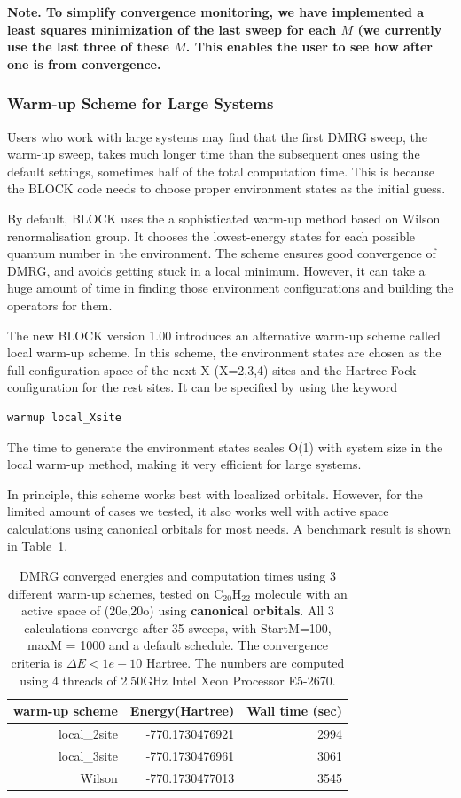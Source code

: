 \documentclass[letterpaper,12pt,aps, pra]{revtex4-1}
\begin{document}
{\bf Note.  To simplify convergence monitoring, we have implemented a least
squares minimization of the last sweep for each $M$ (we currently use the last
three of these $M$. This enables the user to see how after one is from
convergence.}

\subsubsection{Warm-up Scheme for Large Systems}
Users who work with large systems may find that the first DMRG sweep, the warm-up sweep, takes much longer time than the subsequent ones using the default settings, sometimes half of the total computation time. This is because the BLOCK code needs to choose proper environment states as the initial guess. 

By default, BLOCK uses the a sophisticated warm-up method based on Wilson renormalisation group. It chooses the lowest-energy states for each possible quantum number in the environment. The scheme ensures good convergence of DMRG, and avoids getting stuck in a local minimum. However, it can take a huge amount of time in finding those environment configurations and building the operators for them. 

The new BLOCK version 1.00 introduces an alternative warm-up scheme called local warm-up scheme. In this scheme, the environment states are chosen as the full configuration space of the next X (X=2,3,4) sites and the Hartree-Fock configuration for the rest sites. It can be specified by using the keyword
\begin{verbatim}
warmup local_Xsite
\end{verbatim}
The time to generate the environment states scales O(1) with system size in the local warm-up method, making it very efficient for large systems.

In principle, this scheme works best with localized orbitals. However, for the limited amount of cases we tested, it also works well with active space calculations using canonical orbitals for most needs. A benchmark result is shown in Table~\ref{tab:warmup}.

\begin{table}
\begin{center}
\begin{tabular}{rrr}
\hline
\hline
warm-up scheme& Energy(Hartree)& Wall time (sec)\\
\hline
local\_2site&-770.1730476921&2994\\
local\_3site&-770.1730476961&3061\\
Wilson&-770.1730477013&3545\\
\hline
\hline
\end{tabular}
\end{center}
\caption{
  DMRG converged energies and computation times using 3 different warm-up schemes, tested on C$_{20}$H$_{22}$ molecule with an active space of (20e,20o) using \textbf{canonical orbitals}. All 3 calculations converge after 35 sweeps, with StartM=100, maxM = 1000 and a default schedule. The convergence criteria is $\Delta E<1e-10$ Hartree. The numbers are computed using 4 threads of 2.50GHz Intel Xeon Processor E5-2670.
} \label{tab:warmup}
\end{table}
\end{document}
